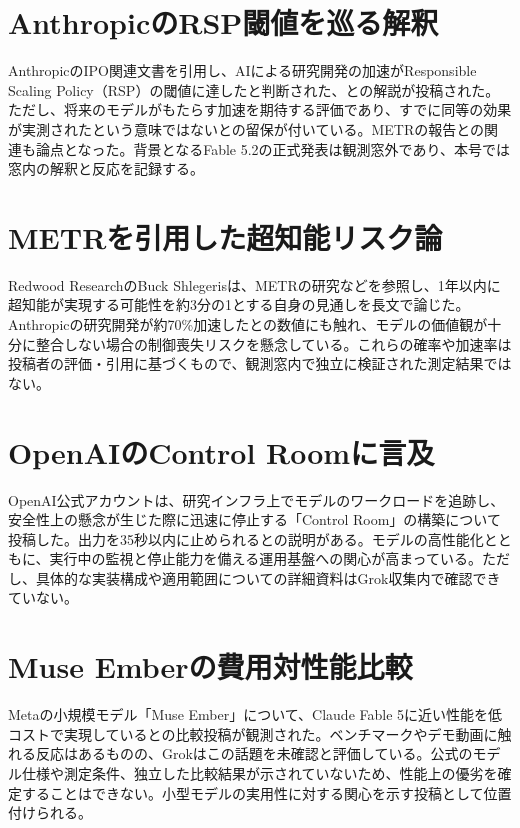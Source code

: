\section{AnthropicのRSP閾値を巡る解釈}
AnthropicのIPO関連文書を引用し、AIによる研究開発の加速がResponsible Scaling Policy（RSP）の閾値に達したと判断された、との解説が投稿された。ただし、将来のモデルがもたらす加速を期待する評価であり、すでに同等の効果が実測されたという意味ではないとの留保が付いている。METRの報告との関連も論点となった。背景となるFable 5.2の正式発表は観測窓外であり、本号では窓内の解釈と反応を記録する。

\section{METRを引用した超知能リスク論}
Redwood ResearchのBuck Shlegerisは、METRの研究などを参照し、1年以内に超知能が実現する可能性を約3分の1とする自身の見通しを長文で論じた。Anthropicの研究開発が約70\%加速したとの数値にも触れ、モデルの価値観が十分に整合しない場合の制御喪失リスクを懸念している。これらの確率や加速率は投稿者の評価・引用に基づくもので、観測窓内で独立に検証された測定結果ではない。

\section{OpenAIのControl Roomに言及}
OpenAI公式アカウントは、研究インフラ上でモデルのワークロードを追跡し、安全性上の懸念が生じた際に迅速に停止する「Control Room」の構築について投稿した。出力を35秒以内に止められるとの説明がある。モデルの高性能化とともに、実行中の監視と停止能力を備える運用基盤への関心が高まっている。ただし、具体的な実装構成や適用範囲についての詳細資料はGrok収集内で確認できていない。

\section{Muse Emberの費用対性能比較}
Metaの小規模モデル「Muse Ember」について、Claude Fable 5に近い性能を低コストで実現しているとの比較投稿が観測された。ベンチマークやデモ動画に触れる反応はあるものの、Grokはこの話題を未確認と評価している。公式のモデル仕様や測定条件、独立した比較結果が示されていないため、性能上の優劣を確定することはできない。小型モデルの実用性に対する関心を示す投稿として位置付けられる。
